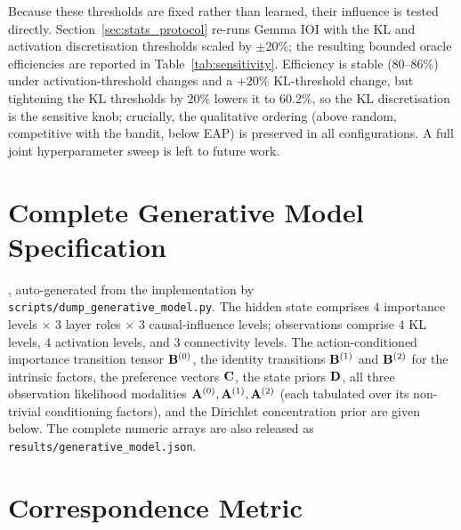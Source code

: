 Because these thresholds are fixed rather than learned, their
influence is tested directly. Section~\ref{sec:stats_protocol} re-runs Gemma IOI with the KL
and activation discretisation thresholds scaled by $\pm 20\%$; the resulting bounded
oracle efficiencies are reported in Table~\ref{tab:sensitivity}. Efficiency is stable
(80--86\%) under activation-threshold changes and a $+20\%$ KL-threshold change, but
tightening the KL thresholds by $20\%$ lowers it to $60.2\%$, so the KL discretisation
is the sensitive knob; crucially, the qualitative ordering (above random, competitive
with the bandit, below EAP) is preserved in all configurations. A full joint
hyperparameter sweep is left to future work.


\section{Complete Generative Model Specification}
\label{app:generative_model}

, auto-generated from the
implementation by
\texttt{scripts/\allowbreak dump\_\allowbreak generative\_\allowbreak model.py}. The hidden state comprises
$4$ importance levels $\times$ $3$ layer roles $\times$ $3$ causal-influence levels;
observations comprise $4$ KL levels, $4$ activation levels, and $3$ connectivity
levels. The action-conditioned importance transition tensor $\mathbf{B}^{(0)}$, the
identity transitions $\mathbf{B}^{(1)}$ and $\mathbf{B}^{(2)}$ for the intrinsic factors,
the preference vectors $\mathbf{C}$, the state priors $\mathbf{D}$, all three observation
likelihood modalities $\mathbf{A}^{(0)},\mathbf{A}^{(1)},\mathbf{A}^{(2)}$ (each tabulated
over its non-trivial conditioning factors), and the Dirichlet concentration prior
are given below. The complete numeric arrays are also released as
\texttt{results/generative\_model.json}.




\section{Correspondence Metric}
\label{app:correspondence}


